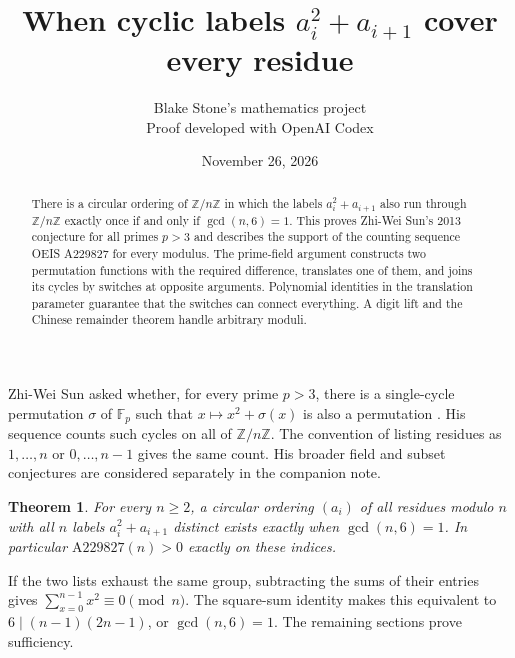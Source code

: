 \documentclass[11pt]{article}
\title{When cyclic labels $a_i^2+a_{i+1}$ cover every residue}
\author{Blake Stone's mathematics project\\\small Proof developed with OpenAI Codex}
\date{November 26, 2026}
\newtheorem{theorem}{Theorem}
\newcommand{\F}{\mathbb F}
\begin{document}
\maketitle
\begin{abstract}
There is a circular ordering of $\mathbb Z/n\mathbb Z$ in which the labels $a_i^2+a_{i+1}$ also run through $\mathbb Z/n\mathbb Z$ exactly once if and only if $\gcd(n,6)=1$. This proves Zhi-Wei Sun's 2013 conjecture for all primes $p>3$ and describes the support of the counting sequence OEIS A229827 for every modulus. The prime-field argument constructs two permutation functions with the required difference, translates one of them, and joins its cycles by switches at opposite arguments. Polynomial identities in the translation parameter guarantee that the switches can connect everything. A digit lift and the Chinese remainder theorem handle arbitrary moduli.
\end{abstract}

Zhi-Wei Sun asked whether, for every prime $p>3$, there is a single-cycle permutation $\sigma$ of $\F_p$ such that $x\mapsto x^2+\sigma(x)$ is also a permutation \cite{oeis}. His sequence counts such cycles on all of $\mathbb Z/n\mathbb Z$. The convention of listing residues as $1,\ldots,n$ or $0,\ldots,n-1$ gives the same count. His broader field and subset conjectures \cite{slides} are considered separately in the companion note.

\begin{theorem}\label{th:main}
For every $n\ge2$, a circular ordering $(a_i)$ of all residues modulo $n$ with all $n$ labels $a_i^2+a_{i+1}$ distinct exists exactly when $\gcd(n,6)=1$. In particular $\mathrm{A229827}(n)>0$ exactly on these indices.
\end{theorem}
If the two lists exhaust the same group, subtracting the sums of their entries gives $\sum_{x=0}^{n-1}x^2\equiv0\pmod n$. The square-sum identity makes this equivalent to $6\mid(n-1)(2n-1)$, or $\gcd(n,6)=1$. The remaining sections prove sufficiency.
\end{document}
